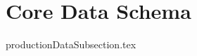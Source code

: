 \documentclass{book}
\title{}  %
\begin{document}
\ifstandalone
\maketitle %
\clearpage
\tableofcontents %
\clearpage
\fi

\section{Core Data Schema}

{productionDataSubsection.tex}
\end{document}
